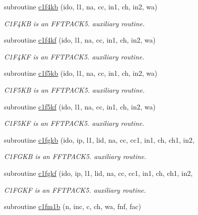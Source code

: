 \begin{DoxyCompactItemize}
subroutine \mbox{\hyperlink{namespacefftclass_a16b67c4056cd4bef03d70d6289f60954}{c1f4kb}} (ido, l1, na, cc, in1, ch, in2, wa)
\begin{DoxyCompactList}\small\item\em C1\+F4\+KB is an F\+F\+T\+P\+A\+C\+K5. auxiliary routine. \end{DoxyCompactList}\item 
subroutine \mbox{\hyperlink{namespacefftclass_a4121c0b7de23d7df058852fb75a9a31a}{c1f4kf}} (ido, l1, na, cc, in1, ch, in2, wa)
\begin{DoxyCompactList}\small\item\em C1\+F4\+KF is an F\+F\+T\+P\+A\+C\+K5. auxiliary routine. \end{DoxyCompactList}\item 
subroutine \mbox{\hyperlink{namespacefftclass_aa356856107611ad66966fed70ede74f1}{c1f5kb}} (ido, l1, na, cc, in1, ch, in2, wa)
\begin{DoxyCompactList}\small\item\em C1\+F5\+KB is an F\+F\+T\+P\+A\+C\+K5. auxiliary routine. \end{DoxyCompactList}\item 
subroutine \mbox{\hyperlink{namespacefftclass_a21d2647f4c2392ed5498288f99a3203c}{c1f5kf}} (ido, l1, na, cc, in1, ch, in2, wa)
\begin{DoxyCompactList}\small\item\em C1\+F5\+KF is an F\+F\+T\+P\+A\+C\+K5. auxiliary routine. \end{DoxyCompactList}\item 
subroutine \mbox{\hyperlink{namespacefftclass_ac9b19ae24fcc92a08a29696cf60fd412}{c1fgkb}} (ido, ip, l1, lid, na, cc, cc1, in1, ch, ch1, in2,
\begin{DoxyCompactList}\small\item\em C1\+F\+G\+KB is an F\+F\+T\+P\+A\+C\+K5. auxiliary routine. \end{DoxyCompactList}\item 
subroutine \mbox{\hyperlink{namespacefftclass_ac6d6749fee5ff8e325bdf80834fa5337}{c1fgkf}} (ido, ip, l1, lid, na, cc, cc1, in1, ch, ch1, in2,
\begin{DoxyCompactList}\small\item\em C1\+F\+G\+KF is an F\+F\+T\+P\+A\+C\+K5. auxiliary routine. \end{DoxyCompactList}\item 
subroutine \mbox{\hyperlink{namespacefftclass_a2f5368919279e1986ee34764caa05fe0}{c1fm1b}} (n, inc, c, ch, wa, fnf, fac)

\end{DoxyCompactItemize}
